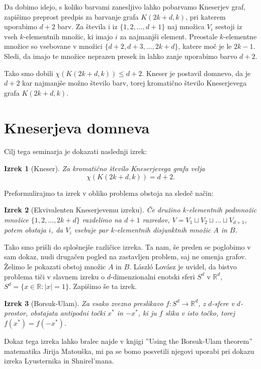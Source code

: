 \documentclass[a4paper,12pt]{article}
\newtheorem{izrek}{Izrek}
\begin{document}
Da dobimo idejo, s koliko barvami zanesljivo lahko pobarvamo Kneserjev graf, zapišimo preprost predpis za barvanje grafa $K(2k+d,k)$, pri katerem uporabimo $d+2$ barv. Za števila i iz $\{1,2,\ldots,d+1\}$ naj množica $V_i$ sestoji iz vseh $k$-elementnih množic, ki imajo $i$ za najmanjši element. Preostale \mbox{$k$-elementne} množice so vsebovane v množici $\{d+2,d+3,\ldots,2k+d\}$, katere moč je le $2k-1$. Sledi, da imajo te množice neprazen presek in lahko zanje uporabimo barvo $d+2$. 

Tako smo dobili $\chi(K(2k+d,k)) \leq d+2$. Kneser je postavil domnevo, da je $d+2$ kar najmanjše možno število barv, torej kromatično število Kneserjevega grafa $K(2k+d,k)$.

\section{Kneserjeva domneva}

Cilj tega seminarja je dokazati naslednji izrek:
\begin{izrek}[Kneser]
Za kromatično število Kneserjevega grafa velja
$$\chi(K(2k+d,k)) = d+2.$$
\end{izrek}

\noindent
Preformulirajmo ta izrek v obliko problema obstoja na sledeč način:

\begin{izrek}[Ekvivalenten Kneserjevemu izreku]
Če družino $k$-elementnih podmnožic množice $\{1, 2, \ldots, 2k+d\}$ razdelimo na $d+1$ razredov,  $V = V_1 \sqcup V_2 \sqcup \ldots \sqcup V_{d+1}$, potem obstaja $i$, da $V_i$ vsebuje par $k$-elementnih disjunktnih množic $A$ in $B$.
\end{izrek}

Tako smo prišli do splošnejše različice izreka. Ta nam, še preden se poglobimo v sam dokaz, nudi drugačen pogled na zastavljen problem, saj ne omenja grafov. Želimo le pokazati obstoj množic $A$ in $B$. László Lovász je uvidel, da bistvo problema tiči v slavnem izreku o $d$-dimenzionalni enotski sferi $S^d$ v $\mathbb{R}^d $, $S^d = \{x \in \mathbb{R}: |x|=1\}$. Zapišimo še ta izrek.

\begin{izrek}[Borsuk-Ulam]
Za vsako zvezno preslikavo $f:S^d \rightarrow \mathbb{R}^d$, z $d$-sfere v $d$-prostor, obstajata antipodni točki $x^*$ in $-x^*$, ki ju $f$ slika v isto točko, torej $f(x^*)=f(-x^*)$.
\end{izrek}

Dokaz tega izreka lahko bralec najde v knjigi ''Using the Borsuk-Ulam theorem'' matematika Jirija Matouška, mi pa se bomo posvetili njegovi uporabi pri dokazu izreka Lyusternika in Shnirel'mana.
\end{document}
